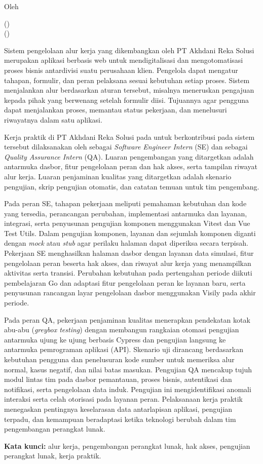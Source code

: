 \clearpage
{}
\begin{center}
{\bfseries \JudulLaporan\par}
\vspace{0.3cm}
Oleh\par
\NamaRaif{} (\NIMRaif)\\
\NamaFrederiko{} (\NIMFrederiko)
\end{center}
\vspace{0.3cm}
Sistem pengelolaan alur kerja yang dikembangkan oleh PT Akhdani Reka Solusi merupakan aplikasi berbasis web untuk mendigitalisasi dan mengotomatisasi proses bisnis antardivisi suatu perusahaan klien. Pengelola dapat mengatur tahapan, formulir, dan peran pelaksana sesuai kebutuhan setiap proses. Sistem menjalankan alur berdasarkan aturan tersebut, misalnya meneruskan pengajuan kepada pihak yang berwenang setelah formulir diisi. Tujuannya agar pengguna dapat menjalankan proses, memantau status pekerjaan, dan menelusuri riwayatnya dalam satu aplikasi.

Kerja praktik di PT Akhdani Reka Solusi pada \PeriodeKP{} untuk berkontribusi pada sistem tersebut dilaksanakan oleh \NamaRaif{} sebagai \textit{Software Engineer Intern} (SE) dan \NamaFrederiko{} sebagai \textit{Quality Assurance Intern} (QA). Luaran pengembangan yang ditargetkan adalah antarmuka dasbor, fitur pengelolaan peran dan hak akses, serta tampilan riwayat alur kerja. Luaran penjaminan kualitas yang ditargetkan adalah skenario pengujian, skrip pengujian otomatis, dan catatan temuan untuk tim pengembang.

Pada peran SE, tahapan pekerjaan meliputi pemahaman kebutuhan dan kode yang tersedia, perancangan perubahan, implementasi antarmuka dan layanan, integrasi, serta penyusunan pengujian komponen menggunakan Vitest dan Vue Test Utils. Dalam pengujian komponen, layanan dan sejumlah komponen diganti dengan \textit{mock} atau \textit{stub} agar perilaku halaman dapat diperiksa secara terpisah. Pekerjaan SE menghasilkan halaman dasbor dengan layanan data simulasi, fitur pengelolaan peran beserta hak akses, dan riwayat alur kerja yang menampilkan aktivitas serta transisi. Perubahan kebutuhan pada pertengahan periode diikuti pembelajaran Go dan adaptasi fitur pengelolaan peran ke layanan baru, serta penyusunan rancangan layar pengelolaan dasbor menggunakan Visily pada akhir periode.

Pada peran QA, pekerjaan penjaminan kualitas menerapkan pendekatan kotak abu-abu (\textit{greybox testing}) dengan membangun rangkaian otomasi pengujian antarmuka ujung ke ujung berbasis Cypress dan pengujian langsung ke antarmuka pemrograman aplikasi (API). Skenario uji dirancang berdasarkan kebutuhan pengguna dan penelusuran kode sumber untuk memeriksa alur normal, kasus negatif, dan nilai batas masukan. Pengujian QA mencakup tujuh modul lintas tim pada dasbor pemantauan, proses bisnis, autentikasi dan notifikasi, serta pengelolaan data induk. Pengujian ini mengidentifikasi anomali interaksi serta celah otorisasi pada layanan peran. Pelaksanaan kerja praktik menegaskan pentingnya keselarasan data antarlapisan aplikasi, pengujian terpadu, dan kemampuan beradaptasi ketika teknologi berubah dalam tim pengembangan perangkat lunak.

\vspace{0.3cm}
\noindent\textbf{Kata kunci:} alur kerja, pengembangan perangkat lunak, hak akses, pengujian perangkat lunak, kerja praktik.

